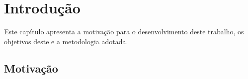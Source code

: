 \chapter[Introdução]{Introdução}


Este capítulo apresenta a motivação para o desenvolvimento deste trabalho, os objetivos deste e a metodologia adotada.

\section{Motivação} %







